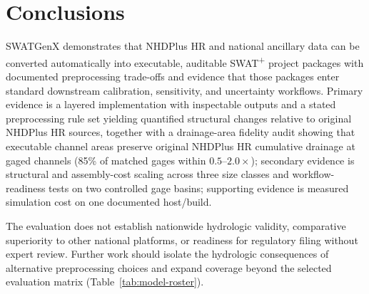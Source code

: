 \section{Conclusions}

SWATGenX demonstrates that NHDPlus HR and national ancillary data can be converted automatically into executable, auditable SWAT\textsuperscript{+} project packages with documented preprocessing trade-offs and evidence that those packages enter standard downstream calibration, sensitivity, and uncertainty workflows.
Primary evidence is a layered implementation with inspectable outputs and a stated preprocessing rule set yielding quantified structural changes relative to original NHDPlus HR sources, together with a drainage-area fidelity audit showing that executable channel areas preserve original NHDPlus HR cumulative drainage at gaged channels (85\% of matched gages within $0.5$--$2.0\times$); secondary evidence is structural and assembly-cost scaling across three size classes and workflow-readiness tests on two controlled gage basins; supporting evidence is measured simulation cost on one documented host/build.

The evaluation does not establish nationwide hydrologic validity, comparative superiority to other national platforms, or readiness for regulatory filing without expert review. Further work should isolate the hydrologic consequences of alternative preprocessing choices and expand coverage beyond the selected evaluation matrix (Table~\ref{tab:model-roster}).
